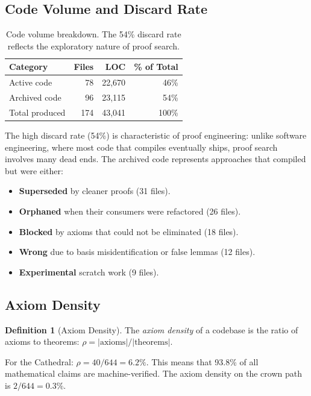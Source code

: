 \documentclass[11pt,a4paper]{article}
\theoremstyle{definition}
\newtheorem{definition}{Definition}[section]
\begin{document}
\subsection{Code Volume and Discard Rate}

\begin{table}[h]
\centering
\begin{tabular}{@{}lrrr@{}}
\toprule
\textbf{Category} & \textbf{Files} & \textbf{LOC} & \textbf{\% of Total} \\
\midrule
Active code & 78 & 22,670 & 46\% \\
Archived code & 96 & 23,115 & 54\% \\
\midrule
Total produced & 174 & 43,041 & 100\% \\
\bottomrule
\end{tabular}
\caption{Code volume breakdown. The 54\% discard rate reflects the
exploratory nature of proof search.}
\label{tab:volume}
\end{table}

The high discard rate (54\%) is characteristic of proof engineering:
unlike software engineering, where most code that compiles eventually
ships, proof search involves many dead ends. The archived code
represents approaches that compiled but were either:

\begin{itemize}
  \item \textbf{Superseded} by cleaner proofs (31 files).
  \item \textbf{Orphaned} when their consumers were refactored (26 files).
  \item \textbf{Blocked} by axioms that could not be eliminated (18 files).
  \item \textbf{Wrong} due to basis misidentification or false lemmas (12 files).
  \item \textbf{Experimental} scratch work (9 files).
\end{itemize}

\subsection{Axiom Density}

\begin{definition}[Axiom Density]
The \emph{axiom density} of a codebase is the ratio of axioms to
theorems: $\rho = |\text{axioms}| / |\text{theorems}|$.
\end{definition}

For the Cathedral: $\rho = 40 / 644 = 6.2\%$. This means that
93.8\% of all mathematical claims are machine-verified. The axiom
density on the crown path is $2 / 644 = 0.3\%$.
\end{document}
